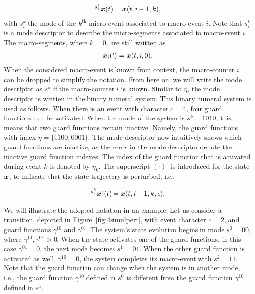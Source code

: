 \documentclass[../DC2017114Bouma.tex]{subfiles}
\begin{document}
\begin{align}
\hspace{0cm}^{s^k_i}{\boldsymbol{x}}(t) = {\boldsymbol{x}}(t,i-1,k),
\end{align}
with $s^k_i$ the mode of the $k^{\text{th}}$ micro-event associated to macro-event $i$. Note that $s_i^k$ is a mode descriptor to describe the micro-segments associated to macro-event $i$. The macro-segments, where $k=0$, are still written as 
\begin{align}
{\boldsymbol{x}}_i(t) = {\boldsymbol{x}}(t,i,0).
\end{align}
When the considered macro-event is known from context, the macro-counter $i$ can be dropped to simplify the notation. From here on, we will write the mode descriptor as $s^k$ if the macro-counter $i$ is known. Similar to $\eta$, the mode descriptor is written in the binary numeral system. This binary numeral system is used as follows. When there is an event with character $c = 4$, four guard functions can be activated. When the mode of the system is $s^k = 1010$, this means that two guard functions remain inactive. Namely, the guard functions with index $\eta = \{0100,0001\}$. The mode descriptor now intuitively shows which guard functions are inactive, as the zeros in the mode descriptor denote the inactive guard function indexes. The index of the guard function that is activated during event $k$ is denoted by $\eta_k$. The superscript $(\cdot)^{\epsilon}$ is introduced for the state ${\boldsymbol{x}}$, to indicate that the state trajectory is perturbed, i.e.,

\begin{align}
\hspace{0cm}^{s^k_i}{\boldsymbol{x}}^{\epsilon}(t) = {\boldsymbol{x}}(t,i-1,k,\epsilon).
\end{align}

We will illustrate the adopted notation in an example. Let us consider a transition, depicted in Figure~\ref{fig:4simulpert}, with event character $c = 2$, and guard functions $\gamma^{10}$ and $\gamma^{01}$. The system's state evolution begins in mode $s^0 = 00$, where $\gamma^{10},\gamma^{01}>0$. When the state activates one of the guard functions, in this case $\gamma^{01}=0$, the next mode becomes $s^1 = 01$. When the other guard function is activated as well, $\gamma^{10} = 0$, the system completes its macro-event with $s^2 = 11$. Note that the guard function can change when the system is in another mode, i.e., the guard function $\gamma^{10}$ defined in $s^0$ is different from the guard function $\gamma^{10}$ defined in $s^1$.
\end{document}
